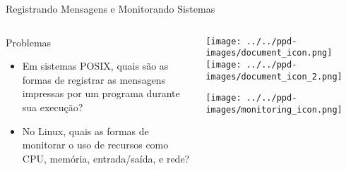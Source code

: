 \documentclass[10pt, compress, aspectratio=169, xcolor={table,usenames,dvipsnames}]{beamer}
\begin{document}
\begin{frame}[label={sec:org9073ee0}]{Registrando Mensagens e Monitorando Sistemas}
\begin{columns}
\begin{column}{0.6\columnwidth}
\begin{block}{Problemas}
\begin{itemize}
\item Em sistemas POSIX,  quais são as formas de \alert{registrar  as mensagens impressas}
por um programa durante sua execução?
\item No Linux, quais as formas de \alert{monitorar  o uso de recursos} como CPU, memória,
entrada/saída, e rede?
\end{itemize}
\end{block}
\end{column}
\begin{column}{0.4\columnwidth}
\begin{center}
  \texttt{[image: ../../ppd-images/document\_icon.png]}
  \texttt{[image: ../../ppd-images/document\_icon\_2.png]}

  \vspace{1em}

  \texttt{[image: ../../ppd-images/monitoring\_icon.png]}
\end{center}
\end{column}
\end{columns}
\end{frame}
\end{document}
